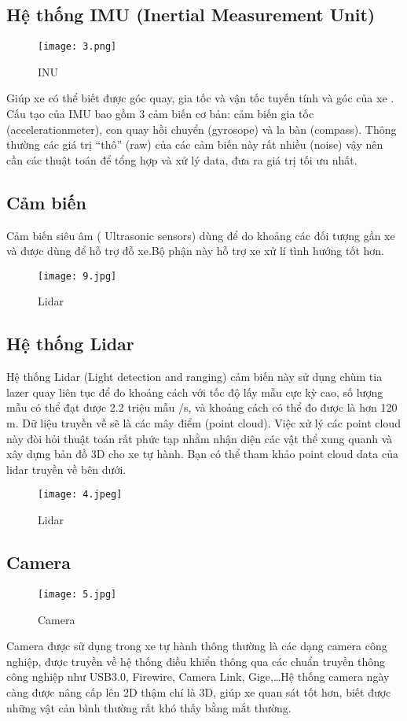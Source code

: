 \documentclass[18pt]{article}
\begin{document}
\newpage
\subsection{Hệ thống IMU (Inertial Measurement Unit)\cite{link2}}
\begin{figure}[h]
\centering 
\texttt{[image: 3.png]} 
\caption{INU} 
\label{dinhnghia} 
\end{figure}
Giúp xe có thể biết được góc quay, gia tốc và vận tốc tuyến tính và góc của xe . Cấu tạo của IMU bao gồm 3 cảm biến cơ bản: cảm biến gia tốc (accelerationmeter), con quay hồi chuyển (gyrosope) và la bàn (compass). Thông thường các giá trị “thô” (raw) của các cảm biến này rất nhiều (noise) vậy nên cần các thuật toán để tổng hợp và xử lý data, đưa ra giá trị tối ưu nhất.\newpage


\subsection{Cảm biến\cite{link}}
Cảm biến siêu âm ( Ultrasonic sensors) dùng để do khoảng các đối tượng gần xe và được dùng để hỗ trợ đỗ xe.Bộ phận này hỗ trợ xe xử lí tình hướng tốt hơn.
\begin{figure}[h]
\centering 
\texttt{[image: 9.jpg]} 
\caption{Lidar} 
\label{dinhnghia} 
\end{figure}\newpage
\subsection{Hệ thống Lidar\cite{link} }
Hệ thống Lidar (Light detection and ranging) cảm biến này sử dụng chùm tia lazer quay liên tục để đo khoảng cách với tốc độ lấy mẫu cực kỳ cao, số lượng mẫu có thể đạt được 2.2 triệu mẫu /s, và khoảng cách có thể đo được là hơn 120 m. Dữ liệu truyền về sẽ là các mây điểm (point cloud). Việc xử lý các point cloud này đòi hỏi thuật toán rất phức tạp nhằm nhận diện các vật thể xung quanh và xây dựng bản đồ 3D cho xe tự hành. Bạn có thể tham khảo point cloud data của lidar truyền về bên dưới.
\begin{figure}[h]
\centering 
\texttt{[image: 4.jpeg]} 
\caption{Lidar} 
\label{dinhnghia} 
\end{figure}
\subsection{Camera\cite{link}}
\begin{figure}[h]
\centering 
\texttt{[image: 5.jpg]} 
\caption{Camera}
\label{dinhnghia} 
\end{figure}
Camera được sử dụng trong xe tự hành thông thường là các dạng camera công nghiệp, được truyền về hệ thống điều khiển thông qua các chuẩn truyền thông công nghiệp như USB3.0, Firewire, Camera Link, Gige,…Hệ thống camera ngày càng được nâng cấp lên 2D thậm chí là 3D, giúp xe quan sát tốt hơn, biết được những vật cản bình thường rất khó thấy bằng mắt thường.\newpage
\end{document}
